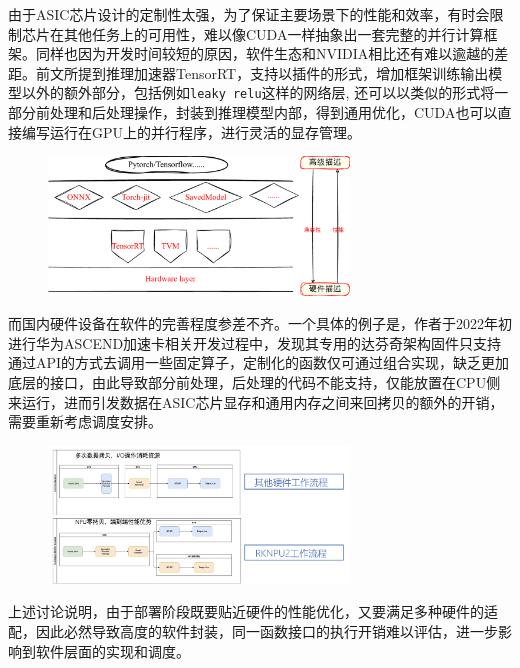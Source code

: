 \documentclass[master]{shtthesis}
\begin{document}
由于ASIC芯片设计的定制性太强，为了保证主要场景下的性能和效率，有时会限制芯片在其他任务上的可用性，难以像CUDA一样抽象出一套完整的并行计算框架。同样也因为开发时间较短的原因，软件生态和NVIDIA相比还有难以逾越的差距。前文所提到推理加速器TensorRT，支持以插件的形式，增加框架训练输出模型以外的额外部分，包括例如\verb|leaky relu|\cite{xu2015empirical}这样的网络层, 还可以以类似的形式将一部分前处理和后处理操作，封装到推理模型内部，得到通用优化，CUDA也可以直接编写运行在GPU上的并行程序，进行灵活的显存管理。

\begin{figure}[htbp]
	\centering
	\includegraphics[width=8cm]{img/4.pdf}
	\label{视觉算法模型的兼容性和性能权衡}
\end{figure}

而国内硬件设备在软件的完善程度参差不齐。一个具体的例子是，作者于2022年初进行华为ASCEND加速卡相关开发过程中，发现其专用的达芬奇架构固件只支持通过API的方式去调用一些固定算子，定制化的函数仅可通过组合实现，缺乏更加底层的接口，由此导致部分前处理，后处理的代码不能支持，仅能放置在CPU侧来运行，进而引发数据在ASIC芯片显存和通用内存之间来回拷贝的额外的开销，需要重新考虑调度安排。
\begin{figure}[htbp]
	\centering
	\includegraphics[width=8cm]{img/rknn_support.jpeg}
	\label{rknn-support}
\end{figure}

上述讨论说明，由于部署阶段既要贴近硬件的性能优化，又要满足多种硬件的适配，因此必然导致高度的软件封装，同一函数接口的执行开销难以评估，进一步影响到软件层面的实现和调度。
\end{document}
